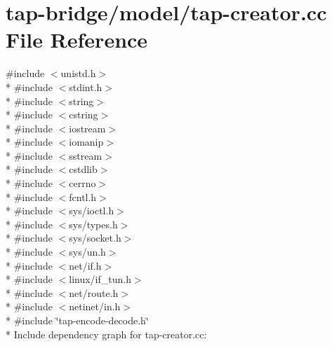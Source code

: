\hypertarget{tap-creator_8cc}{}\section{tap-\/bridge/model/tap-\/creator.cc File Reference}
\label{tap-creator_8cc}
{\ttfamily \#include $<$unistd.\+h$>$}\\*
{\ttfamily \#include $<$stdint.\+h$>$}\\*
{\ttfamily \#include $<$string$>$}\\*
{\ttfamily \#include $<$cstring$>$}\\*
{\ttfamily \#include $<$iostream$>$}\\*
{\ttfamily \#include $<$iomanip$>$}\\*
{\ttfamily \#include $<$sstream$>$}\\*
{\ttfamily \#include $<$cstdlib$>$}\\*
{\ttfamily \#include $<$cerrno$>$}\\*
{\ttfamily \#include $<$fcntl.\+h$>$}\\*
{\ttfamily \#include $<$sys/ioctl.\+h$>$}\\*
{\ttfamily \#include $<$sys/types.\+h$>$}\\*
{\ttfamily \#include $<$sys/socket.\+h$>$}\\*
{\ttfamily \#include $<$sys/un.\+h$>$}\\*
{\ttfamily \#include $<$net/if.\+h$>$}\\*
{\ttfamily \#include $<$linux/if\+\_\+tun.\+h$>$}\\*
{\ttfamily \#include $<$net/route.\+h$>$}\\*
{\ttfamily \#include $<$netinet/in.\+h$>$}\\*
{\ttfamily \#include \char`\"{}tap-\/encode-\/decode.\+h\char`\"{}}\\*
Include dependency graph for tap-\/creator.cc\+:
